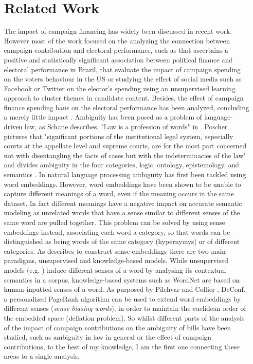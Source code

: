 \documentclass{custom_report}
\begin{document}
\chapter{Related Work}
\label{cha:related_work}
The impact of campaign financing has widely been discussed in recent work. However most of the work focused on the analyzing the connection between campaign contribution and electoral performance, such as \cite{brazil_campaign_finance} that ascertains a positive and statistically significant association between political finance and electoral performance in Brazil,  \cite{congressional_elections} that evaluate the impact of campaign spending on the voters behaviour in the US or \cite{social_media} studying the effect of social media such as Facebook or Twitter on the elector's spending using an unsupervised learning approach to cluster themes in candidate content. Besides, the effect of campaign finance spending bans on the electoral performance has been analyzed, concluding a merely little impact \cite{citizens_united}. 
\newline
Ambiguity has been posed as a problem of language-driven law, as Schane describes, "Law is a profession of words" in \cite{ambiguity_law_schane}. Poscher pictures that "significant portions of the institutional legal system, especially courts at the appellate level and supreme courts, are for the most part concerned not with disentangling the facts of cases but with the indeterminacies of the law" and divides ambiguity in the four categories, logic, ontology, epistemology, and semantics \cite{ambiguity_law_poscher}.  
\newline
In natural language processing ambiguity has first been tackled using word embeddings. However, word embeddings have been shown to be unable to capture different meanings of a word, even if the meaning occurs in the same dataset. In fact different meanings have a negative impact on accurate semantic modeling as unrelated words that have a sense similar to different senses of the same word are pulled together. This problem can be solved by using sense embeddings instead, associating each word a category, so that words can be distinguished as being words of the same category (hypernymys) or of different categories. As \cite{word_to_sense_embedding} describes to construct sense embeddings there are two main paradigms, unsupervised and knowledge-based models. While unsupervised models (e.g. \cite{unsupervised_latent_vector_weighting}) induce different senses of a word by analysing its contextual semantics in a corpus, knowledge-based systems such as WordNet \cite{wordnet} are based on human-inputted senses of a word. As purposed by Pilehvar and Collier \cite{knowledge_based_page_rank}, DeConf, a personalized PageRank algorithm can be used to extend word embeddings by different senses (\textit{sense biasing words}), in order to maintain the euclidean order of the embedded space (deflation problem).
\newline
So whilst different parts of the analysis of the impact of campaign contributions on the ambiguity of bills have been studied, such as ambiguity in law in general or the effect of campaign contributions, to the best of my knowledge, I am the first one connecting these areas to a single analysis. 
\end{document}
